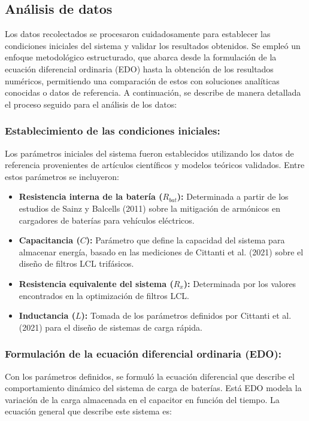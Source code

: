 \subsection{Análisis de datos}
Los datos recolectados se procesaron cuidadosamente para establecer las condiciones iniciales del
sistema y validar los resultados obtenidos. Se empleó un enfoque metodológico estructurado, que
abarca desde la formulación de la ecuación diferencial ordinaria (EDO) hasta la obtención de los
resultados numéricos, permitiendo una comparación de estos con soluciones analíticas conocidas o
datos de referencia. A continuación, se describe de manera detallada el proceso seguido para el
análisis de los datos:

\subsubsection*{Establecimiento de las condiciones iniciales:}
Los parámetros iniciales del sistema fueron establecidos utilizando los datos de referencia
provenientes de artículos científicos y modelos teóricos validados. Entre estos parámetros se
incluyeron:

\begin{itemize}
	\item \textbf{Resistencia interna de la batería (\(R_{bat}\)):} Determinada a partir de los estudios de Sainz y Balcells (2011) sobre la mitigación de armónicos en cargadores de baterías para vehículos eléctricos.

	\item \textbf{Capacitancia (\(C\)):} Parámetro que define la capacidad del sistema para almacenar energía, basado en las mediciones de Cittanti et al. (2021) sobre el diseño de filtros LCL trifásicos.

	\item \textbf{Resistencia equivalente del sistema (\(R_x\)):} Determinada por los valores encontrados en la optimización de filtros LCL.

	\item \textbf{Inductancia (\(L\)):} Tomada de los parámetros definidos por Cittanti et al. (2021) para el diseño de sistemas de carga rápida.
\end{itemize}

\subsubsection*{Formulación de la ecuación diferencial ordinaria (EDO):}
Con los parámetros definidos, se formuló la ecuación diferencial que describe el
comportamiento dinámico del sistema de carga de baterías. Está EDO modela la variación de
la carga almacenada en el capacitor en función del tiempo. La ecuación general que describe
este sistema es:

